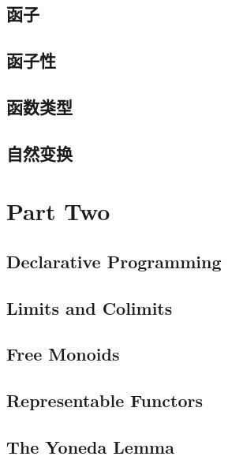 \chapter{函子}\label{functors}


\chapter{函子性}\label{functoriality}


\chapter{函数类型}\label{function-types}


\chapter{自然变换}\label{natural-transformations}


\part*{Part Two}

\chapter{Declarative Programming}\label{declarative-programming}


\chapter{Limits and Colimits}\label{limits-and-colimits}


\chapter{Free Monoids}\label{free-monoids}


\chapter{Representable Functors}\label{representable-functors}


\chapter{The Yoneda Lemma}\label{the-yoneda-lemma}


